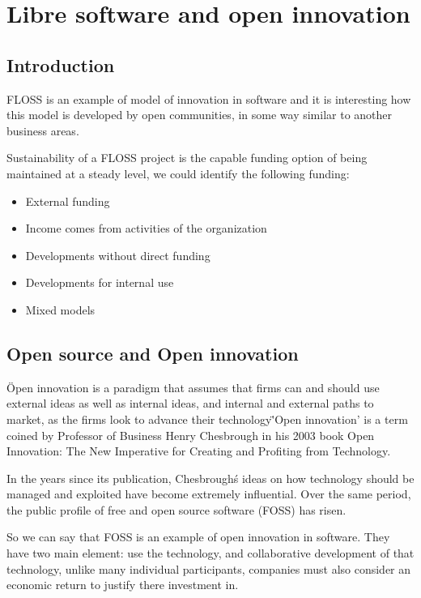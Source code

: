 \chapter{Libre software and open innovation}

\section{Introduction}\label{lesson-5-introduction}
FLOSS is an example of model of innovation in software and it is interesting how this model is developed by open communities, in some way similar to another business areas.  

Sustainability of a FLOSS project is the capable funding option of being maintained at a steady level, we could identify the following funding:
 	\begin{itemize}
		\item External funding
		\item Income comes from activities of the organization
		\item Developments without direct funding
		\item Developments for internal use
		\item Mixed models
 	\end{itemize}
 	

\section{Open source and Open innovation} \label{Open source and Open innovation}
\"Open innovation is a paradigm that assumes that firms can and should use external ideas as well as internal ideas, and internal and external paths to market, as the firms look to advance their technology\"
'Open innovation' is a term coined by Professor of Business Henry Chesbrough in his 2003 book Open Innovation: The New Imperative for Creating and Profiting from Technology. 

In the years since its publication, Chesbrough\'s ideas on how technology should be managed and exploited have become extremely influential. Over the same period, the public profile of free and open source software (FOSS) has risen. 

So we can say that FOSS is an example of open innovation in software.
They have two main element: use the technology, and collaborative development of that technology, unlike many individual participants, companies must also consider an economic return to justify there investment in.


